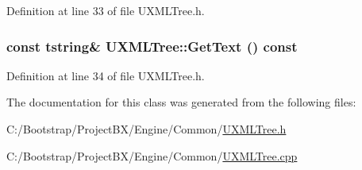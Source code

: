 Definition at line 33 of file UXMLTree.h.\hypertarget{class_u_x_m_l_tree_4c6ca28ab1ca79c50cf12d457d72a40b}{
\subsubsection[{GetText}]{\setlength{\rightskip}{0pt plus 5cm}const {\bf tstring}\& UXMLTree::GetText () const}}
\label{class_u_x_m_l_tree_4c6ca28ab1ca79c50cf12d457d72a40b}




Definition at line 34 of file UXMLTree.h.

The documentation for this class was generated from the following files:\begin{CompactItemize}
\item 
C:/Bootstrap/ProjectBX/Engine/Common/\hyperlink{_u_x_m_l_tree_8h}{UXMLTree.h}\item 
C:/Bootstrap/ProjectBX/Engine/Common/\hyperlink{_u_x_m_l_tree_8cpp}{UXMLTree.cpp}\end{CompactItemize}
